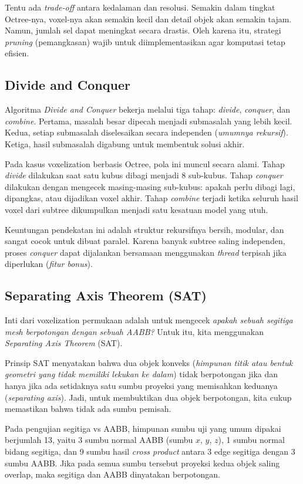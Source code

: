 \documentclass[11pt,a4paper]{article}
\begin{document}
Tentu ada \textit{trade-off} antara kedalaman dan resolusi. Semakin dalam tingkat Octree-nya, voxel-nya
akan semakin kecil dan detail objek akan semakin tajam. Namun, jumlah sel dapat meningkat secara drastis.
Oleh karena itu, strategi \textit{pruning} (pemangkasan) wajib untuk diimplementasikan 
agar komputasi tetap efisien. 

\subsection{Divide and Conquer}
Algoritma \textit{Divide and Conquer} bekerja melalui tiga tahap: \textit{divide}, \textit{conquer},
dan \textit{combine}. Pertama, masalah besar dipecah menjadi submasalah yang lebih kecil. Kedua,
setiap submasalah diselesaikan secara independen (\textit{umumnya rekursif}). Ketiga, hasil
submasalah digabung untuk membentuk solusi akhir.

Pada kasus voxelization berbasis Octree, pola ini muncul secara alami. Tahap \textit{divide}
dilakukan saat satu kubus dibagi menjadi 8 sub-kubus. Tahap \textit{conquer} dilakukan dengan
mengecek masing-masing sub-kubus: apakah perlu dibagi lagi, dipangkas, atau dijadikan voxel akhir.
Tahap \textit{combine} terjadi ketika seluruh hasil voxel dari subtree dikumpulkan menjadi satu kesatuan model yang utuh.

Keuntungan pendekatan ini adalah struktur rekursifnya bersih, modular, dan sangat cocok untuk
dibuat paralel. Karena banyak subtree saling independen, proses \textit{conquer} dapat dijalankan
bersamaan menggunakan \textit{thread} terpisah jika diperlukan (\textit{fitur bonus}).
\subsection{Separating Axis Theorem (SAT)}
Inti dari voxelization permukaan adalah untuk mengecek
\textit{apakah sebuah segitiga mesh berpotongan dengan sebuah AABB?}
Untuk itu, kita menggunakan \textit{Separating Axis Theorem} (SAT).

Prinsip SAT menyatakan bahwa dua objek konveks (\textit{himpunan titik atau bentuk geometri yang tidak memiliki lekukan ke dalam}) 
tidak berpotongan jika dan hanya jika ada
setidaknya satu sumbu proyeksi yang memisahkan keduanya (\textit{separating axis}). Jadi,
untuk membuktikan dua objek berpotongan, kita cukup memastikan bahwa tidak ada sumbu pemisah.

Pada pengujian segitiga vs AABB, himpunan sumbu uji yang umum dipakai berjumlah 13, yaitu
3 sumbu normal AABB (sumbu $x$, $y$, $z$),
1 sumbu normal bidang segitiga,
dan 9 sumbu hasil \textit{cross product} antara 3 edge segitiga dengan 3 sumbu AABB.
Jika pada semua sumbu tersebut proyeksi kedua objek saling overlap, maka segitiga
dan AABB dinyatakan berpotongan.
\end{document}
